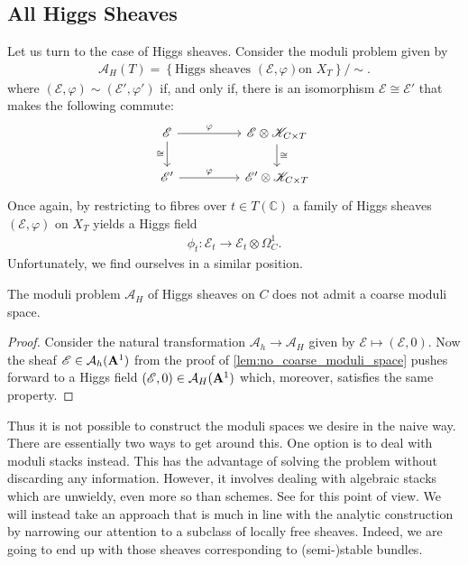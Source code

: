 \documentclass[12pt]{ociamthesis}  %
\begin{document}
\subsection{All Higgs Sheaves}

Let us turn to the case of Higgs sheaves. Consider the moduli problem
given by 
\begin{align*}
  \mathcal A_H(T) = \left\lbrace{\text{Higgs sheaves $(\mathscr E,\varphi)$
      on $X_T$}}\right\rbrace/\sim.
\end{align*}
where $(\mathscr E,\varphi)\sim(\mathscr E',\varphi')$ if, and only if,
there is an isomorphism $\mathscr E\cong\mathscr E'$ that makes the
following commute:
\begin{equation*}
  \begin{tikzcd}
    {\mathscr E} && {\mathscr E\otimes \mathscr K_{C\times T}} \\
    {\mathscr E'} && {\mathscr E'\otimes\mathscr K_{C\times T}}
    \arrow["\varphi", from=1-1, to=1-3]
    \arrow["\cong"', from=1-1, to=2-1]
    \arrow["\cong", from=1-3, to=2-3]
    \arrow["\varphi", from=2-1, to=2-3]
  \end{tikzcd}
\end{equation*}
Once again, by restricting to fibres over $t\in T(\mathbb{C})$
a family of Higgs sheaves $(\mathscr E,\varphi)$ on $X_T$ yields
a Higgs field
\begin{align*}
  \phi_t : \mathscr E_t \to \mathscr E_t \otimes \Omega^1_C.
\end{align*}
Unfortunately, we find ourselves in a similar position.
\begin{corollary}
  The moduli problem $\mathcal A_H$ of Higgs sheaves on $C$ does not admit
  a coarse moduli space.
  \begin{proof}
    Consider the natural transformation $\mathcal A_h\to\mathcal A_H$
    given by $\mathscr E \mapsto (\mathscr E,0)$. Now the sheaf
    $\mathscr E\in\mathcal A_h(\mathbf{A}^{1}_{})$ from the proof of
    \ref{lem:no_coarse_moduli_space} pushes forward to a Higgs field
    $(\mathscr E,0)\in\mathcal A_H(\mathbf{A}^{1}_{})$ which, moreover,
    satisfies the same property.
  \end{proof}
\end{corollary}
Thus it is not possible to construct the moduli spaces we desire
in the naive way. There are essentially two ways to get around this.
One option is to deal with
moduli stacks instead. This has the advantage of solving the problem
without discarding any information. However, it involves dealing with
algebraic stacks which are unwieldy, even more so than schemes.
See \cite{cm2017} for this point of view. We will instead take an
approach that is much in line with the analytic construction by narrowing
our attention to a subclass of locally free sheaves. Indeed, we are
going to end up with those sheaves corresponding to (semi-)stable
bundles.
\end{document}
